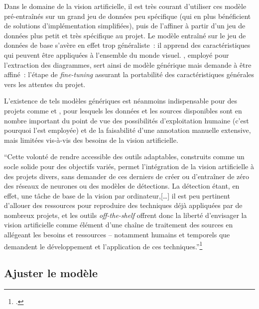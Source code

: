 Dans le domaine de la vision artificielle, il est très courant
d'utiliser ces modèle pré-entraînés sur un grand jeu de données peu
spécifique (qui en plus bénéficient de solutions d'implémentation
simplifiées), puis de l'affiner à partir d'un jeu de données plus petit
et très spécifique au projet. Le modèle entraîné sur le jeu de données
de base s'avère en effet trop généraliste~: il apprend des
caractéristiques qui peuvent être appliquées à l'ensemble du monde
visuel. \yolov, employé pour l'extraction des diagrammes, sert ainsi de
modèle générique mais demande à être affiné~: l'étape de \textit{fine-tuning} assurant la portabilité des caractéristiques générales vers les
attentes du projet.

L'existence de tels modèles génériques est néanmoins indispensable pour
des projets comme \eida et \vhs, pour lesquels les données et les sources
disponibles sont en nombre important du point de vue des possibilités
d'exploitation humaine (c'est pourquoi l'\ia est employée) et de la
faisabilité d'une annotation manuelle extensive, mais limitées vis-à-vis
des besoins de la vision artificielle.

\begin{kwote}                                       
``Cette volonté de rendre accessible des outils adaptables, construits
comme un socle solide pour des objectifs variés, permet l'intégration de
la vision artificielle à des projets divers, sans demander de ces
derniers de créer ou d'entraîner de zéro des réseaux de neurones ou des
modèles de détections. La détection étant, en effet, une tâche de base
de la vision par ordinateur,{[}\ldots{]} il est peu pertinent d'allouer
des ressources pour reproduire des techniques déjà appliquées par de
nombreux projets, et les outils \textit{off-the-shelf} offrent donc la liberté
d'envisager la vision artificielle comme élément d'une chaîne de
traitement des sources en allégeant les besoins et ressources --
notamment humains et temporels que demandent le développement et
l'application de ces techniques.''\footcite[p.49]{norindr_traitement_2023}
                      \end{kwote}       

\hypertarget{fine-tuner-le-modele}{%
\subsection{Ajuster le modèle}\label{fine-tuner-le-modele}}

